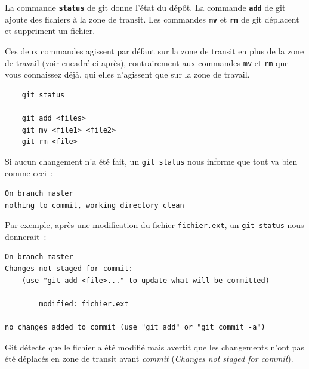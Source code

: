 \documentclass[a4paper,11pt]{style-esi/td}
\begin{document}
La commande \texttt{\textbf{status}} de git donne l'état du dépôt.
La commande \texttt{\textbf{add}} de git ajoute des fichiers à la zone de transit. 
Les commandes \texttt{\textbf{mv}} et \texttt{\textbf{rm}} de git déplacent et suppriment un fichier. 

Ces deux commandes agissent par défaut sur la zone de transit en plus de la zone de travail (voir encadré ci-après), contrairement aux commandes \texttt{mv} et \texttt{rm} que vous connaissez déjà, qui elles n'agissent que sur la zone de travail.

\bigskip
\begin{colxbox}[colback=white,drop fuzzy shadow]
	\begin{verbatim}
	git status

	git add <files>
	git mv <file1> <file2>
	git rm <file>
	\end{verbatim}
\end{colxbox}
\bigskip

Si aucun changement n'a été fait, un \texttt{git status} nous informe que tout va
bien comme ceci :

\begin{verbatim}
On branch master 
nothing to commit, working directory clean 
\end{verbatim}

Par exemple, après une modification du fichier \texttt{fichier.ext}, un
\texttt{git status} nous donnerait : 

\begin{verbatim}
On branch master 
Changes not staged for commit: 
    (use "git add <file>..." to update what will be committed) 

		modified: fichier.ext 

no changes added to commit (use "git add" or "git commit -a") 
\end{verbatim}

Git détecte que le fichier a été modifié mais avertit que les changements n’ont
pas été déplacés en zone de transit avant \textit{commit} (\textit{Changes not staged for
commit}). 
\end{document}

